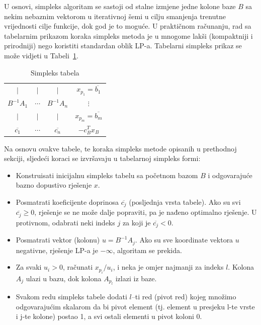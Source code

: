 \documentclass[a4paper, utf8, 11pt, colorlinks]{book}
\begin{document}
U osnovi, simpleks algoritam se sastoji od stalne izmjene jedne kolone baze $B$ sa nekim nebaznim vektorom u iterativnoj šemi u cilju smanjenja trenutne vrijednosti cilje funkcije, dok god je to moguće. 
U praktičnom računanju, rad sa tabelarnim prikazom koraka simpleks metoda je u mnogome lakši (kompaktniji i prirodniji) nego koristiti standardan oblik LP-a. 
Tabelarni simpleks prikaz se može vidjeti u Tabeli~\ref{tab:simplex_tabelau}. 

\begin{table}[!ht]
    \centering
    \begin{tabular}{c c c | c} \\ \hline
            $\mid$          &       $\mid$ &  $\mid$             &    $x_{p_1} = \overline{b_1}$         \\
          $B^{-1}A_1$       &    $\cdots$    &  $B^{-1}A_n$      &    $\vdots$          \\
            $\mid$          &       $\mid$ &  $\mid$             &   $ x_{p_m} = \overline{b_m}$         \\ \hline
          $\overline{c_1}$  &    $\cdots$    & $\overline{c_n}$  &  $-c^T_B x_B$         \\ \hline
    \end{tabular}
    \caption{Simpleks tabela}
    \label{tab:simplex_tabelau}
\end{table}

Na osnovu ovakve tabele, te koraka simpleks metode opisanih u prethodnoj sekciji, sljedeći koraci se izvršavaju u tabelarnoj simpleks formi:
\begin{itemize}
    \item Konstruisati inicijalnu simpleks tabelu sa početnom bazom $B$ i odgovarajuće bazno dopustivo rješenje $x$.
    \item Posmatrati koeficijente doprinosa $\overline{c_j}$ (posljednja vrsta tabele). Ako su svi $\overline{c_j} \geq 0$, rješenje se ne može dalje popraviti, pa je nađeno optimalno rješenje. U protivnom, odabrati neki indeks $j$ za koji je $\overline{c_j}<0$.
    \item Posmatrati vektor (kolonu) $u = B^{-1}A_j$. Ako su sve koordinate vektora $u$ negativne, rješenje LP-a je $-\infty$, algoritam se prekida.
    \item Za svaki $u_i > 0$, računati $x_{p_i}/u_i$, i neka je   omjer najmanji za indeks $l$. Kolona $A_{j}$ ulazi u bazu, dok kolona $A_{p_l}$ izlazi iz baze. 
    \item Svakom redu simpleks tabele dodati $l$--ti red (pivot red) kojeg množimo odgovarajućim
         skalarom da bi pivot element (tj. element u presjeku l-te vrste i j-te kolone) postao 1, a svi ostali elementi u pivot koloni 0.
\end{itemize}
\end{document}
